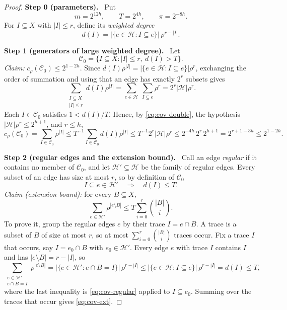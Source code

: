 \documentclass[11pt,letterpaper]{article}
\theoremstyle{definition}
\theoremstyle{remark}
\numberwithin{equation}{section}
\newcommand{\step}[1]{\medskip\noindent\textbf{#1.}\ }
\begin{document}
\begin{proof}
\step{Step 0 (parameters)}
Put
\[
m=2^{12h},\qquad T=2^{4h},\qquad \pi=2^{-8h}.
\]
For \(I\subseteq X\) with \(|I|\le r\), define its \emph{weighted degree}
\[
d(I)=|\{e\in\mathcal H:I\subseteq e\}|\,\rho^{r-|I|}.
\]

\step{Step 1 (generators of large weighted degree)}
Let
\[
\mathcal C_0=\{I\subseteq X:|I|\le r,\ d(I)>T\}.
\]
\emph{Claim:} $c_\rho(\mathcal C_0)\le2^{1-2h}$.
Since $d(I)\rho^{|I|}=|\{e\in\mathcal H:I\subseteq e\}|\rho^r$, exchanging the
order of summation and using that an edge has exactly $2^r$ subsets gives
\begin{equation}\label{eq:cov-double}
\sum_{\substack{I\subseteq X\\|I|\le r}}d(I)\rho^{|I|}
=\sum_{e\in\mathcal H}\ \sum_{I\subseteq e}\rho^r
=2^r|\mathcal H|\rho^r.
\end{equation}
Each $I\in\mathcal C_0$ satisfies $1<d(I)/T$. Hence, by \eqref{eq:cov-double},
the hypothesis $|\mathcal H|\rho^r\le2^{h+1}$, and $r\le h$,
\begin{equation}\label{eq:cov-C0}
c_\rho(\mathcal C_0)
=\sum_{I\in\mathcal C_0}\rho^{|I|}
\le T^{-1}\sum_{I\in\mathcal C_0}d(I)\rho^{|I|}
\le T^{-1}2^r|\mathcal H|\rho^r
\le2^{-4h}\,2^r\,2^{h+1}
=2^{r+1-3h}\le2^{1-2h}.
\end{equation}

\step{Step 2 (regular edges and the extension bound)}
Call an edge \emph{regular} if it contains no member of \(\mathcal C_0\),
and let \(\mathcal H'\subseteq\mathcal H\) be the family of regular edges.
Every subset of an edge has size at most $r$, so by definition of
$\mathcal C_0$
\begin{equation}\label{eq:cov-regular}
I\subseteq e\in\mathcal H'
\quad\Longrightarrow\quad d(I)\le T.
\end{equation}
\emph{Claim (extension bound):} for every \(B\subseteq X\),
\begin{equation}\label{eq:cov-ext}
\sum_{e\in\mathcal H'}\rho^{|e\setminus B|}
\le T\sum_{i=0}^r\binom{|B|}{i}.
\end{equation}
To prove it, group the regular edges $e$ by their trace $I=e\cap B$. A trace is
a subset of $B$ of size at most $r$, so at most $\sum_{i=0}^r\binom{|B|}{i}$
traces occur. Fix a trace $I$ that occurs, say $I=e_0\cap B$ with
$e_0\in\mathcal H'$. Every edge $e$ with trace $I$ contains $I$ and has
$|e\setminus B|=r-|I|$, so
\[
\sum_{\substack{e\in\mathcal H'\\e\cap B=I}}
  \rho^{|e\setminus B|}
=|\{e\in\mathcal H':e\cap B=I\}|\,\rho^{r-|I|}
\le|\{e\in\mathcal H:I\subseteq e\}|\,\rho^{r-|I|}
=d(I)\le T,
\]
where the last inequality is \eqref{eq:cov-regular} applied to
$I\subseteq e_0$. Summing over the traces that occur gives \eqref{eq:cov-ext}.


\end{proof}
\end{document}
